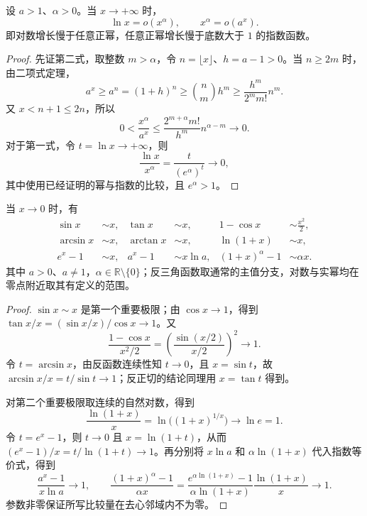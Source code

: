 \begin{proposition}[对数、幂与指数的增长次序]
\label{prop:logarithm-power-exponential-orders}
设 $a>1$、$\alpha>0$。当 $x\to+\infty$ 时，
\begin{equation}
    \ln x=o(x^\alpha),
    \qquad x^\alpha=o(a^x).
    \label{eq:logarithm-power-exponential-orders}
\end{equation}
即对数增长慢于任意正幂，任意正幂增长慢于底数大于 $1$ 的指数函数。
\end{proposition}

\begin{proof}
先证第二式，取整数 $m>\alpha$，令 $n=\lfloor x\rfloor$、$h=a-1>0$。当 $n\geq2m$ 时，由二项式定理，
\[
    a^x\geq a^n=(1+h)^n\geq\binom nm h^m
    \geq\frac{h^m}{2^m m!}n^m.
\]
又 $x<n+1\leq2n$，所以
\[
    0<\frac{x^\alpha}{a^x}
    \leq\frac{2^{m+\alpha}m!}{h^m}n^{\alpha-m}\to0.
\]
对于第一式，令 $t=\ln x\to+\infty$，则
\[
    \frac{\ln x}{x^\alpha}=\frac{t}{(e^\alpha)^t}\to0,
\]
其中使用已经证明的幂与指数的比较，且 $e^\alpha>1$。
\end{proof}

\begin{theorem}[常用等价无穷小]
\label{thm:standard-equivalent-infinitesimals}
当 $x\to0$ 时，有
\begin{equation}
    \begin{aligned}
        \sin x&\sim x,&\tan x&\sim x,&1-\cos x&\sim\frac{x^2}{2},\\
        \arcsin x&\sim x,&\arctan x&\sim x,&\ln(1+x)&\sim x,\\
        e^x-1&\sim x,&a^x-1&\sim x\ln a,&(1+x)^\alpha-1&\sim\alpha x.
    \end{aligned}
    \label{eq:standard-equivalent-infinitesimals}
\end{equation}
其中 $a>0$、$a\neq1$，$\alpha\in\mathbb{R}\setminus\{0\}$；反三角函数取通常的主值分支，对数与实幂均在零点附近取其有定义的范围。
\end{theorem}

\begin{proof}
$\sin x\sim x$ 是第一个重要极限；由 $\cos x\to1$，得到 $\tan x/x=(\sin x/x)/\cos x\to1$。又
\[
    \frac{1-\cos x}{x^2/2}
    =\left(\frac{\sin(x/2)}{x/2}\right)^2\to1.
\]
令 $t=\arcsin x$，由反函数连续性知 $t\to0$，且 $x=\sin t$，故 $\arcsin x/x=t/\sin t\to1$；反正切的结论同理用 $x=\tan t$ 得到。

对第二个重要极限取连续的自然对数，得到
\[
    \frac{\ln(1+x)}x
    =\ln\bigl((1+x)^{1/x}\bigr)\to\ln e=1.
\]
令 $t=e^x-1$，则 $t\to0$ 且 $x=\ln(1+t)$，从而 $(e^x-1)/x=t/\ln(1+t)\to1$。再分别将 $x\ln a$ 和 $\alpha\ln(1+x)$ 代入指数等价式，得到
\[
    \frac{a^x-1}{x\ln a}\to1,
    \qquad
    \frac{(1+x)^\alpha-1}{\alpha x}
    =\frac{e^{\alpha\ln(1+x)}-1}{\alpha\ln(1+x)}
      \frac{\ln(1+x)}x\to1.
\]
参数非零保证所写比较量在去心邻域内不为零。
\end{proof}

